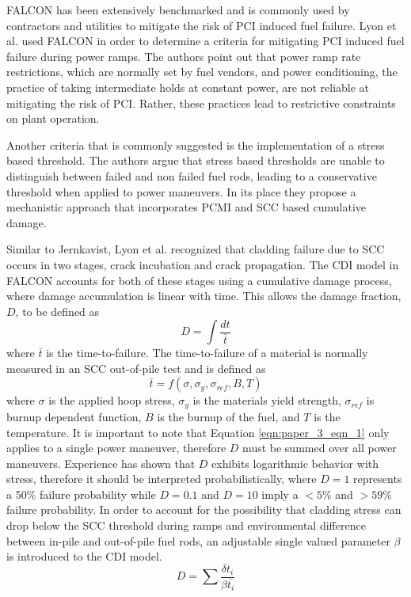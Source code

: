 \documentclass[edeposit,fullpage,12pt]{uiucthesis2009}
\begin{document}
FALCON has been extensively benchmarked and is commonly used by contractors and utilities to mitigate the risk of \gls{PCI} induced fuel failure.
Lyon et al. \cite{lyon_pci_2009} used FALCON in order to determine a criteria for mitigating \gls{PCI} induced fuel failure during power ramps.
The authors point out that power ramp rate restrictions, which are normally set by fuel vendors, and power conditioning, the practice of taking intermediate holds at constant power, are not reliable at mitigating the risk of \gls{PCI}. 
Rather, these practices lead to restrictive constraints on plant operation.

Another criteria that is commonly suggested is the implementation of a stress based threshold.
The authors argue that stress based thresholds are unable to distinguish between failed and non failed fuel rods, leading to a conservative threshold when applied to power maneuvers.
In its place they propose a mechanistic approach that incorporates \gls{PCMI} and \gls{SCC} based cumulative damage.

Similar to Jernkavist,  Lyon et al. recognized that cladding failure due to \gls{SCC} occurs in two stages, crack incubation and crack propagation.
The \gls{CDI} model in FALCON accounts for both of these stages using a cumulative damage process, where damage accumulation is linear with time.
This allows the damage fraction, $D$, to be defined as 
\begin{equation}\label{eqn:paper_3_eqn_1}
D = \int \frac{dt}{\bar{t}}
\end{equation}
where $\bar{t}$ is the time-to-failure.
The time-to-failure of a material is normally measured in an \gls{SCC} out-of-pile test and is defined as
\begin{equation}
\bar{t} = f(\sigma,\sigma_y,\sigma_{ref},B,T)
\end{equation}
where $\sigma$ is the applied hoop stress, $\sigma_y$ is the materials yield strength, $\sigma_{ref}$ is burnup dependent function, $B$ is the burnup of the fuel, and $T$ is the temperature.
It is important to note that Equation \ref{eqn:paper_3_eqn_1} only applies to a single power maneuver, therefore $D$ must be summed over all power maneuvers. 
Experience has shown that $D$ exhibits logarithmic behavior with stress, therefore it should be interpreted probabilistically, where $D=1$ represents a 50\% failure probability while $D=0.1$ and $D=10$ imply a $<5$\% and $>59$\% failure probability.
In order to account for the possibility that cladding stress can drop below the \gls{SCC} threshold during ramps and environmental difference between in-pile and out-of-pile fuel rods, an adjustable single valued parameter $\beta$ is introduced to the \gls{CDI} model. 
\begin{equation}
D = \sum \frac{\delta t_i}{\beta \bar{t_i}}
\end{equation}
\end{document}
